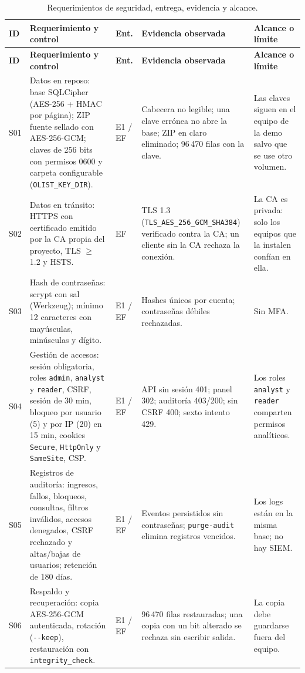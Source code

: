 {\small
\begin{longtable}{@{}P{.055\textwidth}P{.26\textwidth}P{.06\textwidth}P{.29\textwidth}P{.23\textwidth}@{}}
\caption{Requerimientos de seguridad, entrega, evidencia y alcance.}\\
\toprule
\textbf{ID} & \textbf{Requerimiento y control} & \textbf{Ent.} & \textbf{Evidencia observada} & \textbf{Alcance o límite}\\
\midrule
\endfirsthead
\toprule
\textbf{ID} & \textbf{Requerimiento y control} & \textbf{Ent.} & \textbf{Evidencia observada} & \textbf{Alcance o límite}\\
\midrule
\endhead
S01 & Datos en reposo: base SQLCipher (AES-256 + HMAC por página); ZIP fuente sellado con AES-256-GCM; claves de 256 bits con permisos 0600 y carpeta configurable (\texttt{OLIST\_KEY\_DIR}). & E1 / EF & Cabecera no legible; una clave errónea no abre la base; ZIP en claro eliminado; 96\,470 filas con la clave. & Las claves siguen en el equipo de la demo salvo que se use otro volumen.\\
S02 & Datos en tránsito: HTTPS con certificado emitido por la CA propia del proyecto, TLS $\geq$ 1.2 y HSTS. & EF & TLS 1.3 (\texttt{TLS\_AES\_256\_GCM\_SHA384}) verificado contra la CA; un cliente sin la CA rechaza la conexión. & La CA es privada: solo los equipos que la instalen confían en ella.\\
S03 & Hash de contraseñas: scrypt con sal (Werkzeug); mínimo 12 caracteres con mayúsculas, minúsculas y dígito. & E1 / EF & Hashes únicos por cuenta; contraseñas débiles rechazadas. & Sin MFA.\\
S04 & Gestión de accesos: sesión obligatoria, roles \texttt{admin}, \texttt{analyst} y \texttt{reader}, CSRF, sesión de 30 min, bloqueo por usuario (5) y por IP (20) en 15 min, cookies \texttt{Secure}, \texttt{HttpOnly} y \texttt{SameSite}, CSP. & E1 / EF & API sin sesión 401; panel 302; auditoría 403/200; sin CSRF 400; sexto intento 429. & Los roles \texttt{analyst} y \texttt{reader} comparten permisos analíticos.\\
S05 & Registros de auditoría: ingresos, fallos, bloqueos, consultas, filtros inválidos, accesos denegados, CSRF rechazado y altas/bajas de usuarios; retención de 180 días. & E1 / EF & Eventos persistidos sin contraseñas; \texttt{purge-audit} elimina registros vencidos. & Los logs están en la misma base; no hay SIEM.\\
S06 & Respaldo y recuperación: copia AES-256-GCM autenticada, rotación (\texttt{-{}-keep}), restauración con \texttt{integrity\_check}. & E1 / EF & 96\,470 filas restauradas; una copia con un bit alterado se rechaza sin escribir salida. & La copia debe guardarse fuera del equipo.\\

\end{longtable}}
